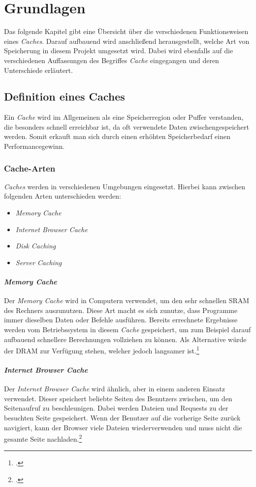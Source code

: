 \chapter{Grundlagen}
\label{cha:grundlagen}
Das folgende Kapitel gibt eine Übersicht über die verschiedenen Funktionsweisen eines \textit{Caches}. Darauf aufbauend wird anschließend herausgestellt, welche Art von Speicherung in diesem Projekt umgesetzt wird. Dabei wird ebenfalls auf die verschiedenen Auffassungen des Begriffes \textit{Cache} eingegangen und deren Unterschiede erläutert.
\section{Definition eines Caches}
\label{sec:cache-definition}
Ein \textit{Cache} wird im Allgemeinen als eine Speicherregion oder Puffer verstanden, die besonders schnell erreichbar ist, da oft verwendete Daten zwischengespeichert werden. Somit erkauft man sich durch einen erhöhten Speicherbedarf einen Performancegewinn.
\subsection{Cache-Arten}
\textit{Caches} werden in verschiedenen Umgebungen eingesetzt. Hierbei kann zwischen folgenden Arten unterschieden werden:
\begin{itemize}
\item \textit{Memory Cache}
\item \textit{Internet Browser Cache}
\item \textit{Disk Caching}
\item \textit{Server Caching}
\end{itemize}
\subsubsection*{\textit{Memory Cache}}
Der \textit{Memory Cache} wird in Computern verwendet, um den sehr schnellen \gls{SRAM} des Rechners auszunutzen. Diese Art macht es sich zunutze, dass Programme immer dieselben Daten oder Befehle ausführen. Bereits errechnete Ergebnisse werden vom Betriebssystem in diesem \textit{Cache} gespeichert, um zum Beispiel darauf aufbauend schnellere Berechnungen vollziehen zu können. Als Alternative würde der \gls{DRAM} zur Verfügung stehen, welcher jedoch langsamer ist.\footcite[Vgl.][S.48f.]{Cache-GummerSommer}\cite[S.48f.]{Cache-GummerSommer}
\subsubsection*{\textit{Internet Browser Cache}}
Der \textit{Internet Browser Cache} wird ähnlich, aber in einem anderen Einsatz verwendet. Dieser speichert beliebte Seiten des Benutzers zwischen, um den Seitenaufruf zu beschleunigen. Dabei werden Dateien und \glspl{Request} zu der besuchten Seite gespeichert. Wenn der Benutzer auf die vorherige Seite zurück navigiert, kann der \gls{Browser} viele Dateien wiederverwenden und muss nicht die gesamte Seite nachladen.\footcite{Cache-Techtarget}

